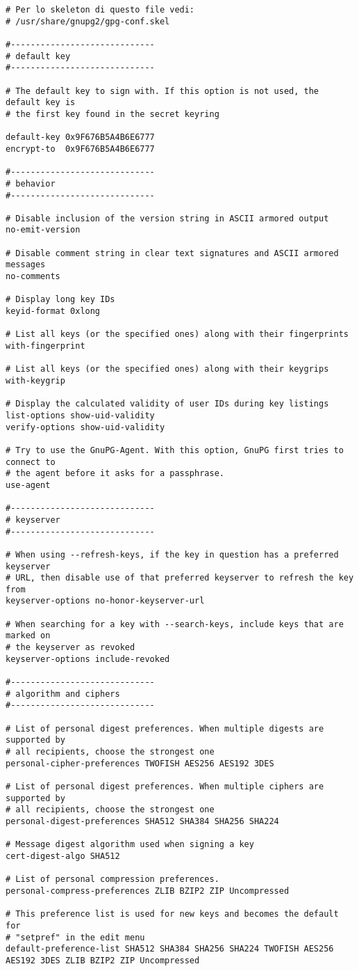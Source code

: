 \documentclass[a4paper,10pt]{article}
\begin{document}
\begin{lstlisting}
# Per lo skeleton di questo file vedi:
# /usr/share/gnupg2/gpg-conf.skel

#-----------------------------
# default key
#-----------------------------

# The default key to sign with. If this option is not used, the default key is
# the first key found in the secret keyring

default-key 0x9F676B5A4B6E6777
encrypt-to  0x9F676B5A4B6E6777

#-----------------------------
# behavior
#-----------------------------

# Disable inclusion of the version string in ASCII armored output
no-emit-version

# Disable comment string in clear text signatures and ASCII armored messages
no-comments

# Display long key IDs
keyid-format 0xlong

# List all keys (or the specified ones) along with their fingerprints
with-fingerprint

# List all keys (or the specified ones) along with their keygrips
with-keygrip

# Display the calculated validity of user IDs during key listings
list-options show-uid-validity
verify-options show-uid-validity

# Try to use the GnuPG-Agent. With this option, GnuPG first tries to connect to
# the agent before it asks for a passphrase.
use-agent

#-----------------------------
# keyserver
#-----------------------------

# When using --refresh-keys, if the key in question has a preferred keyserver
# URL, then disable use of that preferred keyserver to refresh the key from
keyserver-options no-honor-keyserver-url

# When searching for a key with --search-keys, include keys that are marked on
# the keyserver as revoked
keyserver-options include-revoked

#-----------------------------
# algorithm and ciphers
#-----------------------------

# List of personal digest preferences. When multiple digests are supported by
# all recipients, choose the strongest one
personal-cipher-preferences TWOFISH AES256 AES192 3DES

# List of personal digest preferences. When multiple ciphers are supported by
# all recipients, choose the strongest one
personal-digest-preferences SHA512 SHA384 SHA256 SHA224

# Message digest algorithm used when signing a key
cert-digest-algo SHA512

# List of personal compression preferences.
personal-compress-preferences ZLIB BZIP2 ZIP Uncompressed

# This preference list is used for new keys and becomes the default for
# "setpref" in the edit menu
default-preference-list SHA512 SHA384 SHA256 SHA224 TWOFISH AES256 AES192 3DES ZLIB BZIP2 ZIP Uncompressed
\end{lstlisting}
\end{document}
